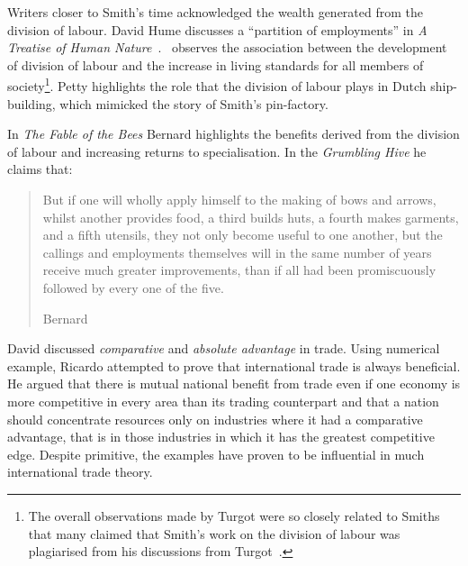 
Writers closer to Smith's time acknowledged the wealth generated from the division of labour. David Hume discusses a ``partition of employments'' in \emph{A Treatise of Human Nature}~\citep{Hume1740}.~\citet{Turgot1774} observes the association between the development of division of labour and the increase in living standards for all members of society\footnote{The overall observations made by Turgot were so closely related to Smiths that many claimed that Smith's work on the division of labour was plagiarised from his discussions from Turgot~\citep{YangNg1998}.}. Petty highlights the role that the division of labour plays in Dutch ship-building, which mimicked the story of Smith's pin-factory.

In \emph{The Fable of the Bees} Bernard \citet{Mandeville1795} highlights the benefits derived from the division of labour and increasing returns to specialisation. In the \emph{Grumbling Hive} he claims that:

\begin{quote}
But if one will wholly apply himself to the making of bows and arrows, whilst another provides food, a third builds huts, a fourth makes garments, and a fifth utensils, they not only become useful to one another, but the callings and employments themselves will in the same number of years receive much greater improvements, than if all had been promiscuously followed by every one of the five.

\begin{flushright}
Bernard \citet[p.~465]{Mandeville1795}
\end{flushright}
\end{quote}

David \citet{Ricardo1817} discussed \emph{comparative} and \emph{absolute advantage} in trade. Using numerical example, Ricardo attempted to prove that international trade is always beneficial. He argued that there is mutual national benefit from trade even if one economy is more competitive in every area than its trading counterpart and that a nation should concentrate resources only on industries where it had a comparative advantage, that is in those industries in which it has the greatest competitive edge. Despite primitive, the examples have proven to be influential in much international trade theory.

